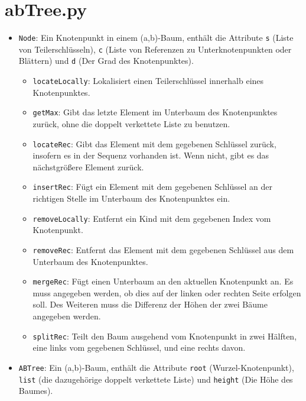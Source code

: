 \section{abTree.py}

\begin{itemize}

    \item \texttt{Node}: Ein Knotenpunkt in einem (a,b)-Baum, enthält die Attribute \texttt{s} (Liste von Teilerschlüsseln), \texttt{c} (Liste von Referenzen zu Unterknotenpunkten oder Blättern) und \texttt{d} (Der Grad des Knotenpunktes).

    \begin{itemize}
        \item \texttt{locateLocally}: Lokalisiert einen Teilerschlüssel innerhalb eines Knotenpunktes.
        \item \texttt{getMax}: Gibt das letzte Element im Unterbaum des Knotenpunktes zurück, ohne die doppelt verkettete Liste zu benutzen.
        \item \texttt{locateRec}: Gibt das Element mit dem gegebenen Schlüssel zurück, insofern es in der Sequenz vorhanden ist. Wenn nicht, gibt es das nächstgrößere Element zurück.
        \item \texttt{insertRec}: Fügt ein Element mit dem gegebenen Schlüssel an der richtigen Stelle im Unterbaum des Knotenpunktes ein.
        \item \texttt{removeLocally}: Entfernt ein Kind mit dem gegebenen Index vom Knotenpunkt.
        \item \texttt{removeRec}: Entfernt das Element mit dem gegebenen Schlüssel aus dem Unterbaum des Knotenpunktes.
        \item \texttt{mergeRec}: Fügt einen Unterbaum an den aktuellen Knotenpunkt an. Es muss angegeben werden, ob dies auf der linken oder rechten Seite erfolgen soll. Des Weiteren muss die Differenz der Höhen der zwei Bäume angegeben werden.
        \item \texttt{splitRec}: Teilt den Baum ausgehend vom Knotenpunkt in zwei Hälften, eine links vom gegebenen Schlüssel, und eine rechts  davon.
    \end{itemize}

    \item \texttt{ABTree}: Ein (a,b)-Baum, enthält die Attribute \texttt{root} (Wurzel-Knotenpunkt), \texttt{list} (die dazugehörige doppelt verkettete Liste) und \texttt{height} (Die Höhe des Baumes).


\end{itemize}
